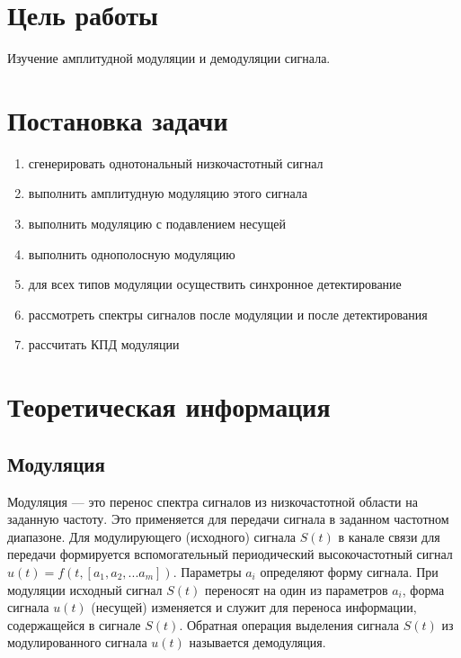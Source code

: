 

\setcounter{tocdepth}{3}







\section{Цель работы}
Изучение амплитудной модуляции и демодуляции сигнала.

\section{Постановка задачи}
\begin{enumerate}
\item сгенерировать однотональный низкочастотный сигнал
\item выполнить амплитудную модуляцию этого сигнала
\item выполнить модуляцию с подавлением несущей
\item выполнить однополосную модуляцию
\item для всех типов модуляции осуществить синхронное детектирование
\item рассмотреть спектры сигналов после модуляции и после детектирования
\item рассчитать КПД модуляции
\end{enumerate}

\section{Теоретическая информация}

\subsection{Модуляция}
Модуляция --- это перенос спектра сигналов из низкочастотной области на заданную частоту. 
Это применяется для передачи сигнала в заданном частотном диапазоне.
Для модулирующего (исходного) сигнала $ S(t) $ в канале связи для передачи формируется  вспомогательный периодический высокочастотный сигнал $u(t)=f(t, [a_1,   a_2,   ...   a_m])$. Параметры $a_i$ определяют форму сигнала. 
При модуляции исходный сигнал $S(t)$ переносят на один из параметров $a_i$, форма сигнала $u(t)$ (несущей) изменяется и 
служит для переноса информации, содержащейся в сигнале $S(t)$. Обратная операция выделения сигнала $S(t)$ из 
модулированного сигнала $u(t)$ называется демодуляция.

